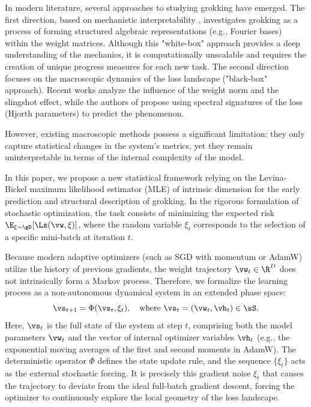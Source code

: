 \documentclass{article}
\begin{document}
In modern literature, several approaches to studying grokking have emerged. The first direction, based on mechanistic interpretability \cite{nanda2023progress, chughtai2023toy}, investigates grokking as a process of forming structured algebraic representations (e.g., Fourier bases) within the weight matrices. Although this "white-box" approach provides a deep understanding of the mechanics, it is computationally unscalable and requires the creation of unique progress measures for each new task. The second direction focuses on the macroscopic dynamics of the loss landscape ("black-box" approach). Recent works \cite{liu2022omnigrok, thilak2022slingshot} analyze the influence of the weight norm and the slingshot effect, while the authors of \cite{notsawo2023predicting} propose using spectral signatures of the loss (Hjorth parameters) to predict the phenomenon.

However, existing macroscopic methods possess a significant limitation: they only capture statistical changes in the system's metrics, yet they remain uninterpretable in terms of the internal complexity of the model.

In this paper, we propose a new statistical framework relying on the Levina-Bickel maximum likelihood estimator (MLE) of intrinsic dimension for the early prediction and structural description of grokking. In the rigorous formulation of stochastic optimization, the task consists of minimizing the expected risk $\E_{\xi \sim \gD}[\Ls(\vw, \xi)]$, where the random variable $\xi_t$ corresponds to the selection of a specific mini-batch at iteration $t$.

Because modern adaptive optimizers (such as SGD with momentum or AdamW) utilize the history of previous gradients, the weight trajectory $\vw_t \in \R^D$ does not intrinsically form a Markov process. Therefore, we formalize the learning process as a non-autonomous dynamical system in an extended phase space:
\begin{equation}
    \vs_{t+1} = \Phi(\vs_t, \xi_t), \quad \text{where } \vs_t = (\vw_t, \vh_t) \in \sS.
\end{equation}
Here, $\vs_t$ is the full state of the system at step $t$, comprising both the model parameters $\vw_t$ and the vector of internal optimizer variables $\vh_t$ (e.g., the exponential moving averages of the first and second moments in AdamW). The deterministic operator $\Phi$ defines the state update rule, and the sequence $\{\xi_t\}$ acts as the external stochastic forcing. It is precisely this gradient noise $\xi_t$ that causes the trajectory to deviate from the ideal full-batch gradient descent, forcing the optimizer to continuously explore the local geometry of the loss landscape.
\end{document}

